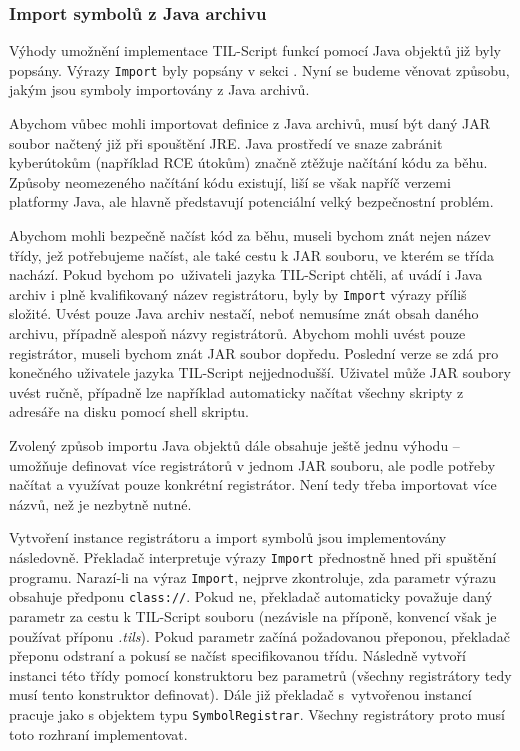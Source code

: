 \subsubsection{Import symbolů z Java archivu}\label{java-import}

Výhody umožnění implementace TIL-Script funkcí pomocí Java objektů již byly popsány. Výrazy
\lstinline{Import} byly popsány v sekci . Nyní se budeme věnovat způsobu,
jakým jsou symboly importovány z Java archivů.

Abychom vůbec mohli importovat definice z Java archivů, musí být daný JAR soubor načtený již při
spouštění JRE. Java prostředí ve snaze zabránit kyberútokům (například RCE útokům) značně ztěžuje
načítání kódu za běhu. Způsoby neomezeného načítání kódu existují, liší se však napříč verzemi
platformy Java, ale hlavně představují potenciální velký bezpečnostní problém.

Abychom mohli bezpečně načíst kód za běhu, museli bychom znát nejen název třídy, jež potřebujeme
načíst, ale také cestu k JAR souboru, ve kterém se třída nachází. Pokud bychom po~uživateli jazyka
TIL-Script chtěli, ať uvádí i Java archiv i plně kvalifikovaný název registrátoru, byly by
\lstinline{Import} výrazy příliš složité. Uvést pouze Java archiv nestačí, neboť nemusíme znát obsah
daného archivu, případně alespoň názvy registrátorů. Abychom mohli uvést pouze registrátor, museli
bychom znát JAR soubor dopředu. Poslední verze se zdá pro konečného uživatele jazyka TIL-Script
nejjednodušší. Uživatel může JAR soubory uvést ručně, případně lze například automaticky načítat
všechny skripty z adresáře na disku pomocí shell skriptu.

Zvolený způsob importu Java objektů dále obsahuje ještě jednu výhodu -- umožňuje definovat více
registrátorů v jednom JAR souboru, ale podle potřeby načítat a využívat pouze konkrétní registrátor.
Není tedy třeba importovat více názvů, než je nezbytně nutné.

Vytvoření instance registrátoru a import symbolů jsou implementovány následovně. Překladač
interpretuje výrazy \lstinline{Import} přednostně hned při spuštění programu. Narazí-li na výraz
\lstinline{Import}, nejprve zkontroluje, zda parametr výrazu obsahuje předponu \lstinline{class://}.
Pokud ne, překladač automaticky považuje daný parametr za cestu k TIL-Script souboru (nezávisle
na příponě, konvencí však je používat příponu \textit{.tils}). Pokud parametr začíná požadovanou
přeponou, překladač přeponu odstraní a pokusí se načíst specifikovanou třídu. Následně vytvoří
instanci této třídy pomocí konstruktoru bez parametrů (všechny registrátory tedy musí tento
konstruktor definovat). Dále již překladač s~vytvořenou instancí pracuje jako s objektem typu
\lstinline{SymbolRegistrar}. Všechny registrátory proto musí toto rozhraní implementovat.

